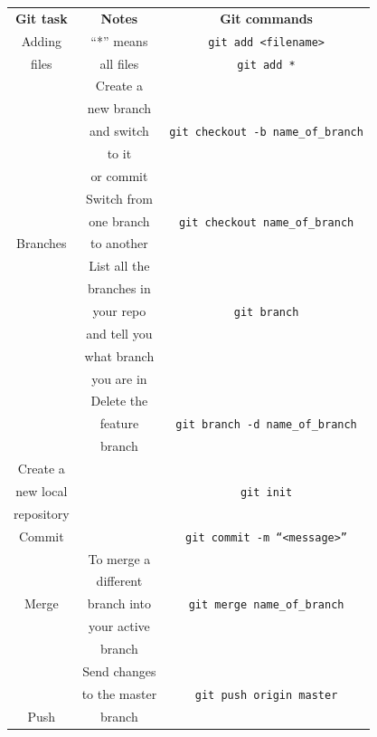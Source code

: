 \documentclass[12pt,a4paper,titlepage,brazil]{article}
\begin{document}
{\begin{table}[h!]
 \begin{center}
  \begin{tabular}{c|c|c}
   \cline{1-3}
   \textbf{Git task} & \textbf{Notes} & \textbf{Git commands} \\
   \cline{1-3}
   Adding & ``*'' means & \texttt{git add <filename>}\\
   files & all files & \texttt{git add *}\\
   \cline{1-3} 
   & Create a & \\
   & new branch & \\
   & and switch & \texttt{git checkout -b name\_of\_branch}\\
   & to it & \\
   & or commit & \\
   \cline{2-3}
   & Switch from & \\
   & one branch & \texttt{git checkout name\_of\_branch}\\
   Branches & to another & \\    
   \cline{2-3}
   & List all the & \\
   & branches in & \\
   & your repo & \texttt{git branch} \\    
   & and tell you & \\
   & what branch & \\
   & you are in & \\
   \cline{2-3} 
   & Delete the & \\
   & feature & \texttt{git branch -d name\_of\_branch}\\
   & branch & \\    
   \cline{1-3}
   Create a & & \\
   new local & & \texttt{git init}\\
   repository & & \\
   \cline{1-3} 
   Commit & & \texttt{git commit -m ``<message>''}\\
   \cline{1-3} 
   & To merge a & \\
   & different & \\
   Merge & branch into & \texttt{git merge name\_of\_branch}\\
   & your active & \\
   & branch & \\
   \cline{1-3} 
   & Send changes & \\
   & to the master & \texttt{git push origin master}\\
   Push & branch & \\

\end{tabular}
\end{center}
\end{table}}
\end{document}
